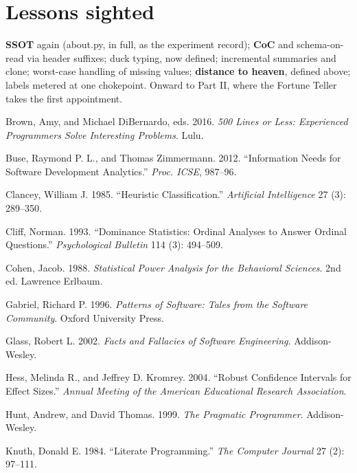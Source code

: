 \documentclass[
  justified]{tufte-book}
\newlength{\cslhangindent}
\newenvironment{CSLReferences}[2] %
 {\begin{list}{}{%
  \setlength{\itemindent}{0pt}
  \setlength{\leftmargin}{0pt}
  \setlength{\parsep}{0pt}
  \ifodd #1
   \setlength{\leftmargin}{\cslhangindent}
   \setlength{\itemindent}{-1\cslhangindent}
  \fi
  \setlength{\itemsep}{#2\baselineskip}}}
 {\end{list}}
\begin{document}
\section{Lessons sighted}\label{lessons-sighted-2}

\textbf{SSOT} again (about.py, in full, as the experiment record);
\textbf{CoC} and schema-on-read via header suffixes; duck typing, now
defined; incremental summaries and clone; worst-case handling of missing
values; \textbf{distance to heaven}, defined above; labels metered at
one chokepoint. Onward to Part II, where the Fortune Teller takes the
first appointment.

\protect{}\label{refs}
\begin{CSLReferences}{1}{1}
Brown, Amy, and Michael DiBernardo, eds. 2016. \emph{500 Lines or Less:
Experienced Programmers Solve Interesting Problems}. Lulu.

Buse, Raymond P. L., and Thomas Zimmermann. 2012. {``Information Needs
for Software Development Analytics.''} \emph{Proc. ICSE}, 987--96.

Clancey, William J. 1985. {``Heuristic Classification.''}
\emph{Artificial Intelligence} 27 (3): 289--350.

Cliff, Norman. 1993. {``Dominance Statistics: Ordinal Analyses to Answer
Ordinal Questions.''} \emph{Psychological Bulletin} 114 (3): 494--509.

Cohen, Jacob. 1988. \emph{Statistical Power Analysis for the Behavioral
Sciences}. 2nd ed. Lawrence Erlbaum.

Gabriel, Richard P. 1996. \emph{Patterns of Software: Tales from the
Software Community}. Oxford University Press.

Glass, Robert L. 2002. \emph{Facts and Fallacies of Software
Engineering}. Addison-Wesley.

Hess, Melinda R., and Jeffrey D. Kromrey. 2004. {``Robust Confidence
Intervals for Effect Sizes.''} \emph{Annual Meeting of the American
Educational Research Association}.

Hunt, Andrew, and David Thomas. 1999. \emph{The Pragmatic Programmer}.
Addison-Wesley.

Knuth, Donald E. 1984. {``Literate Programming.''} \emph{The Computer
Journal} 27 (2): 97--111.


\end{CSLReferences}
\end{document}
